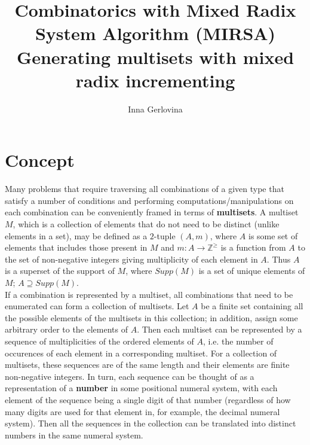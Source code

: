 \documentclass[11pt]{article}
\begin{document}


\title{Combinatorics with Mixed Radix System Algorithm (MIRSA) \\
       {\Large Generating multisets with mixed radix incrementing}}
\author[1]{Inna Gerlovina}
\date{}  
\maketitle

\section{Concept}

Many problems that require traversing all combinations of a given type that satisfy a number of conditions and performing computations/manipulations on each combination can be conveniently framed in terms of \textbf{multisets}. A multiset $M$, which is a collection of elements that do not need to be distinct (unlike elements in a set), may be defined as a $2$-tuple $(A, m)$, where $A$ is some set of elements that includes those present in $M$ and $m:A \to \mathbb{Z}^{\geqslant}$ is a function from $A$ to the set of non-negative integers giving multiplicity of each element in $A$. Thus $A$ is a superset of the support of $M$, where $Supp(M)$ is a set of unique elements of $M$; $A \supseteq Supp(M)$. \\

If a combination is represented by a multiset, all combinations that need to be enumerated can form a collection of multisets. Let $A$ be a finite set containing all the possible elements of the multisets in this collection; in addition, assign some arbitrary order to the elements of $A$. Then each multiset can be represented by a sequence of multiplicities of the ordered elements of $A$, i.e. the number of occurences of each element in a corresponding multiset. For a collection of multisets, these sequences are of the same length and their elements are finite non-negative integers. In turn, each sequence can be thought of as a representation of a \textbf{number} in some positional numeral system, with each element of the sequence being a single digit of that number (regardless of how many digits are used for that element in, for example, the decimal numeral system). Then all the sequences in the collection can be translated into distinct numbers in the same numeral system. \\
\end{document}
